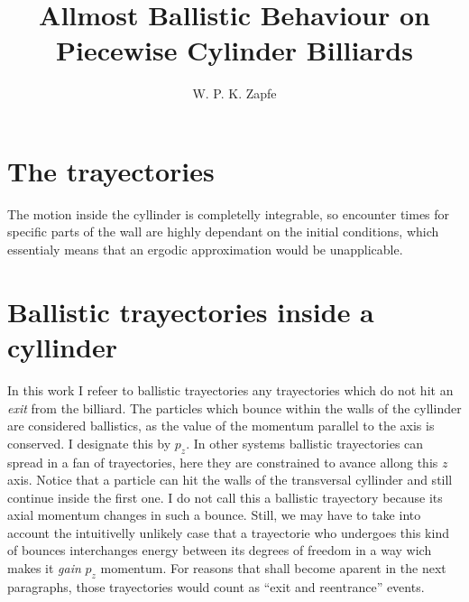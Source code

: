 \documentclass[a4paper,12pt]{article}
\title{Allmost Ballistic Behaviour on Piecewise Cylinder Billiards}
\author{W. P. K. Zapfe}
\begin{document}
\maketitle
{}



\section{The trayectories}

The motion inside the 
cyllinder is completelly integrable,
so encounter times for specific parts of the wall are
highly dependant on the initial conditions, which essentialy means that an 
ergodic approximation would be unapplicable. 


\section{Ballistic trayectories inside a cyllinder}

In this work I refeer to ballistic trayectories any trayectories
which do not hit an \emph{exit} from the billiard. The
particles which bounce within the walls of the cyllinder are considered
ballistics, as the value of the momentum parallel to the axis is
conserved. I designate this by $p_z$. In other systems ballistic
trayectories can spread in a fan of trayectories, here
they are constrained to avance allong this $z$ axis. Notice that
a particle can hit the walls of the transversal cyllinder and still
continue inside the first one. I do not call this a ballistic
trayectory because its axial momentum changes in such a bounce. 
Still, we may have to take into account the intuitivelly unlikely
case that a trayectorie who undergoes this kind of bounces interchanges
energy between its degrees of freedom in a way wich makes it \emph{gain}
$p_z$ momentum. For reasons that shall become aparent in the
next paragraphs, those trayectories would count as ``exit and reentrance'' 
events. 



 
\end{document}
